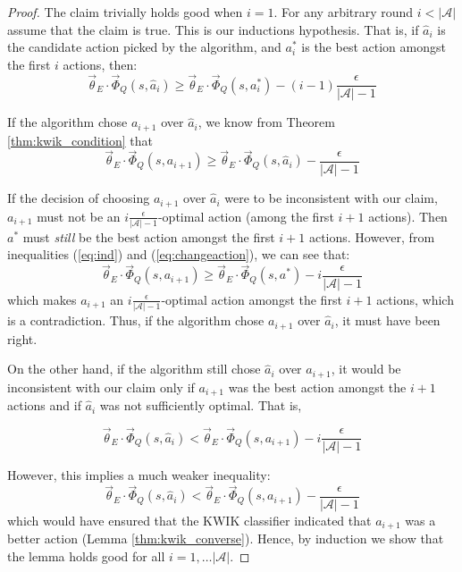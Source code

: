 \begin{proof}
The claim trivially holds good when $i=1$. 
For any arbitrary round $i < |\mathcal{A}|$ assume that the claim is true. This is our inductions hypothesis. That is, if $\hat{a}_i$ is the candidate action picked by the algorithm, and $a_i^*$ is the best action amongst the first $i$ actions, then:
\begin{equation}\label{eq:ind}
\vec{\theta}_E\cdot \vec{\Phi}_Q(s,\hat{a}_i) \geq \vec{\theta}_E\cdot \vec{\Phi}_Q(s,a_i^*) - (i-1)\frac{\epsilon}{|\mathcal{A}|-1} 
\end{equation}

If the algorithm chose $a_{i+1}$ over $\hat{a}_i$, we know from Theorem \ref{thm:kwik_condition}  that
\begin{equation}\label{eq:changeaction}
\vec{\theta}_E\cdot \vec{\Phi}_Q(s,a_{i+1}) \geq \vec{\theta}_E\cdot \vec{\Phi}_Q(s,\hat{a}_i) - \frac{\epsilon}{|\mathcal{A}|-1}
\end{equation}


If the decision of choosing $a_{i+1}$ over $\hat{a}_i$ were to be inconsistent with our claim, $a_{i+1}$ must not be an $i \frac{\epsilon}{|\mathcal{A}|-1}$-optimal action (among the first $i+1$ actions). Then $a^*$ must \textit{still} be the best action amongst the first $i+1$ actions. However, from inequalities (\ref{eq:ind}) and (\ref{eq:changeaction}), we can see that:
\[
\vec{\theta}_E\cdot \vec{\Phi}_Q(s,{a}_{i+1}) \geq \vec{\theta}_E\cdot \vec{\Phi}_Q(s,a^*) - i\frac{\epsilon}{|\mathcal{A}|-1}
\]
which makes $a_{i+1}$ an $i \frac{\epsilon}{|\mathcal{A}|-1}$-optimal action amongst the first $i+1$ actions, which is a contradiction. Thus, if the algorithm chose  $a_{i+1}$ over $\hat{a}_i$, it must have been right.

On the other hand, if the algorithm still chose $\hat{a}_i$ over $a_{i+1}$, it would be inconsistent with our claim only if $a_{i+1}$ was the best action amongst the $i+1$ actions and if $\hat{a}_i$ was not sufficiently optimal. That is,

\begin{equation}\label{eq:notoptimal}
\vec{\theta}_E\cdot \vec{\Phi}_Q(s,\hat{a}_{i}) < \vec{\theta}_E\cdot \vec{\Phi}_Q(s,a_{i+1}) - i\frac{\epsilon}{|\mathcal{A}|-1}
\end{equation}

However, this implies a much weaker inequality:
\[
\vec{\theta}_E\cdot \vec{\Phi}_Q(s,\hat{a}_{i}) < \vec{\theta}_E\cdot \vec{\Phi}_Q(s,a_{i+1}) - \frac{\epsilon}{|\mathcal{A}|-1}
\]
which would have ensured that the KWIK classifier indicated that $a_{i+1}$
was a better action (Lemma \ref{thm:kwik_converse}). Hence, by induction we show that the lemma holds good for all $i = 1, \hdots |\mathcal{A}|$. 

\end{proof}

